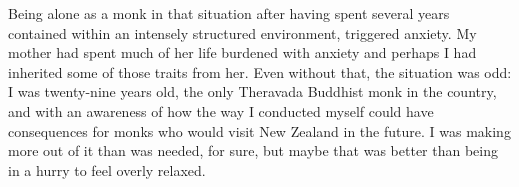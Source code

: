 Being alone as a monk in that situation after having spent several years
contained within an intensely structured environment, triggered anxiety.
My mother had spent much of her life burdened with anxiety and perhaps I
had inherited some of those traits from her. Even without that, the
situation was odd: I was twenty-nine years old, the only Theravada
Buddhist monk in the country, and with an awareness of how the way I
conducted myself could have consequences for monks who would visit New
Zealand in the future. I was making more out of it than was needed, for
sure, but maybe that was better than being in a hurry to feel overly
relaxed.

